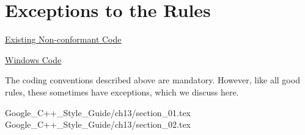 
\chapter{Exceptions to the Rules}\label{ch:exceptions-to-the-rules}

\begin{introduction}
    \item \hyperref[sec:existing-non-conformant-code]{Existing Non-conformant Code}
    \item \hyperref[sec:windows-code]{Windows Code}
\end{introduction}

The coding conventions described above are mandatory. However, like all good rules, these sometimes have exceptions, which we discuss here.

{Google_C++_Style_Guide/ch13/section_01.tex}
{Google_C++_Style_Guide/ch13/section_02.tex}


